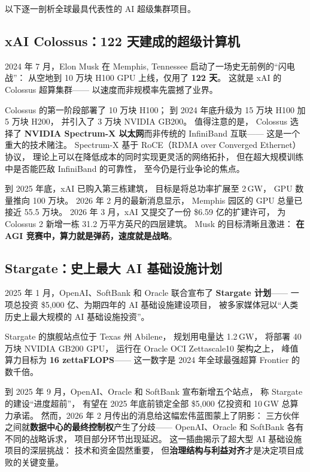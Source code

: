 以下逐一剖析全球最具代表性的 AI 超级集群项目。

\subsection{xAI Colossus：122 天建成的超级计算机}
\label{subsec:xai-colossus}

2024 年 7 月，Elon Musk 在 Memphis, Tennessee 启动了一场史无前例的``闪电战''：
从空地到 10 万块 H100 GPU 上线，仅用了 \textbf{122 天}。
这就是 xAI 的 Colossus 超算集群——
以速度而非规模率先震撼了业界。

Colossus 的第一阶段部署了 10 万块 H100；
到 2024 年底升级为 15 万块 H100 加 5 万块 H200，
并引入了 3 万块 NVIDIA GB200。
值得注意的是，
Colossus 选择了 \textbf{NVIDIA Spectrum-X 以太网}而非传统的 InfiniBand 互联——
这是一个重大的技术赌注。
Spectrum-X 基于 RoCE（RDMA over Converged Ethernet）协议，
理论上可以在降低成本的同时实现更灵活的网络拓扑，
但在超大规模训练中是否能匹敌 InfiniBand 的可靠性，
至今仍是行业争论的焦点。

到 2025 年底，xAI 已购入第三栋建筑，
目标是将总功率扩展至 2\,GW，
GPU 数量推向 100 万块。
2026 年 2 月的最新消息显示，
Memphis 园区的 GPU 总量已接近 55.5 万块。
2026 年 3 月，xAI 又提交了一份 \$6.59 亿的扩建许可，
为 Colossus 2 新增一栋 31.2 万平方英尺的四层建筑。
Musk 的目标清晰且激进：
\textbf{在 AGI 竞赛中，算力就是弹药，速度就是战略}。

\subsection{Stargate：史上最大 AI 基础设施计划}
\label{subsec:stargate}

2025 年 1 月，OpenAI、SoftBank 和 Oracle 联合宣布了 \textbf{Stargate 计划}——
一项总投资 \$5,000 亿、为期四年的 AI 基础设施建设项目，
被多家媒体冠以``人类历史上最大规模的 AI 基础设施投资''。

Stargate 的旗舰站点位于 Texas 州 Abilene，
规划用电量达 1.2\,GW，
将部署 40 万块 NVIDIA GB200 GPU，
运行在 Oracle OCI Zettascale10 架构之上，
峰值算力目标为 \textbf{16 zettaFLOPS}——
这一数字是 2024 年全球最强超算 Frontier 的数千倍。

到 2025 年 9 月，OpenAI、Oracle 和 SoftBank 宣布新增五个站点，
称 Stargate 的建设``进度超前''，
有望在 2025 年底前锁定全部 \$5,000 亿投资和 10\,GW 总算力承诺。
然而，2026 年 2 月传出的消息给这幅宏伟蓝图蒙上了阴影：
三方伙伴之间就\textbf{数据中心的最终控制权}产生了分歧——
OpenAI、Oracle 和 SoftBank 各有不同的战略诉求，
项目部分环节出现延迟。
这一插曲揭示了超大型 AI 基础设施项目的深层挑战：
技术和资金固然重要，
但\textbf{治理结构与利益对齐}才是决定项目成败的关键变量。

